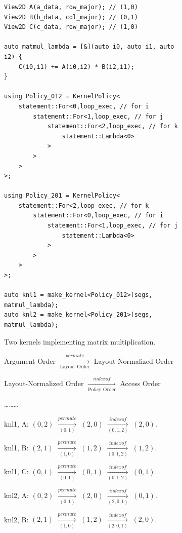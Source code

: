\documentclass[sigconf,review=true]{acmart}
\begin{document}
\begin{figure}

	\begin{subfigure}{0.40\textwidth}
		\begin{lstlisting}
View2D A(a_data, row_major); // (1,0)
View2D B(b_data, col_major); // (0,1)
View2D C(c_data, row_major); // (1,0)

auto matmul_lambda = [&](auto i0, auto i1, auto i2) {
	C(i0,i1) += A(i0,i2) * B(i2,i1);
}

using Policy_012 = KernelPolicy< 
	statement::For<0,loop_exec, // for i
		statement::For<1,loop_exec, // for j
			statement::For<2,loop_exec, // for k
				statement::Lambda<0>
			>
		>
	>
>;

using Policy_201 = KernelPolicy< 
	statement::For<2,loop_exec, // for k
		statement::For<0,loop_exec, // for i
			statement::For<1,loop_exec, // for j
				statement::Lambda<0>
			>
		>
	>
>;

auto knl1 = make_kernel<Policy_012>(segs, matmul_lambda);
auto knl2 = make_kernel<Policy_201>(segs, matmul_lambda);
		\end{lstlisting}
		\caption{Two kernels implementing matrix multiplication.}
		\label{accessOrder:code}
	\end{subfigure}
	\hspace{0.02\textwidth}
	\begin{subfigure}{0.45\textwidth}
		\begin{center}
		Argument Order $\xrightarrow[\text{Layout Order}]{permute}$ Layout-Normalized Order

		Layout-Normalized Order $\xrightarrow[\text{Policy Order}]{indexof}$ Access Order

		\vspace{5px}
		\dots\dots\dots
		\vspace{5px}

		knl1, A: $(0,2)$ $\xrightarrow[(0,1)]{permute}$ $(2,0)$ $\xrightarrow[(0,1,2)]{indexof}$ $(2,0)$.
		
		knl1, B: $(2,1)$ $\xrightarrow[(1,0)]{permute}$ $(1,2)$ $\xrightarrow[(0,1,2)]{indexof}$ $(1,2)$.
		
		knl1, C: $(0,1)$ $\xrightarrow[(0,1)]{permute}$ $(0,1)$ $\xrightarrow[(0,1,2)]{indexof}$ $(0,1)$.
		
		knl2, A: $(0,2)$ $\xrightarrow[(0,1)]{permute}$ $(2,0)$ $\xrightarrow[(2,0,1)]{indexof}$ $(0,1)$.

		knl2, B: $(2,1)$ $\xrightarrow[(1,0)]{permute}$ $(1,2)$ $\xrightarrow[(2,0,1)]{indexof}$ $(2,0)$.


\end{center}
\end{subfigure}
\end{figure}
\end{document}
